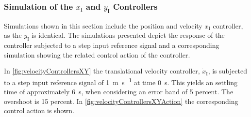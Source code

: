 \subsubsection{Simulation of the $x_{\mathrm{I}}$ and $y_{\mathrm{I}}$ Controllers}
Simulations shown in this section include the position and velocity $x_{\mathrm{I}}$ controller, as the $y_{\mathrm{I}}$ is identical. The simulations presented depict the response of the controller subjected to a step input reference signal and a corresponding simulation showing the related control action of the controller. 

In \autoref{fig:velocityControllersXY} the translational velocity controller, $\dot{x}_{\mathrm{I}}$, is subjected to a step input reference signal of \SI{1}{m s^{-1}} at time \SI{0}{s}. This yields an settling time of approximately \SI{6}{s}, when considering an error band of 5 percent. The overshoot is 15 percent. In \autoref{fig:velocityControllersXYAction} the corresponding control action is shown.

